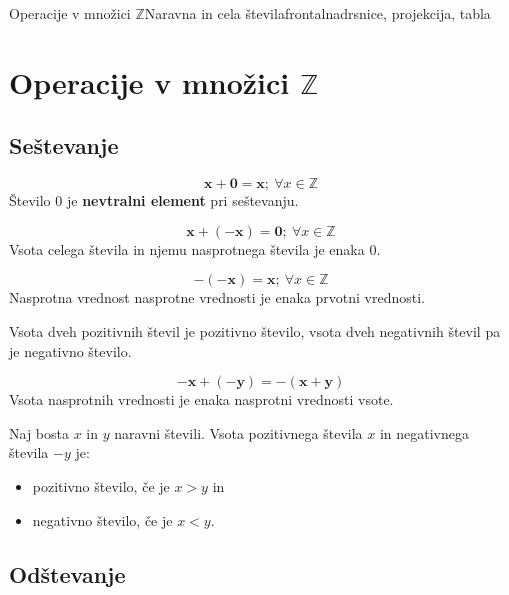 \begin{priprava}{4}{}{Operacije v množici $\mathbb{Z}$}{Naravna in cela števila}{frontalna}{drsnice, projekcija, tabla}


    \section{Operacije v množici $\mathbb{Z}$}

    \subsection{Seštevanje}

     \begin{multicols}{2}
        $$\mathbf{x+0=x}; ~\forall x\in\mathbb{Z}$$
        Število $0$ je \textbf{nevtralni element} pri seštevanju.
     

     
        $$\mathbf{x+(-x)=0}; ~\forall x\in\mathbb{Z} $$
        Vsota celega števila in njemu nasprotnega števila je enaka $0$.
     

     
        $$\mathbf{-(-x)=x}; ~\forall x\in\mathbb{Z}$$
        Nasprotna vrednost nasprotne vrednosti je enaka prvotni vrednosti.
     \newline
 

     
        Vsota dveh pozitivnih števil je pozitivno število, vsota dveh negativnih števil pa je negativno število.
     

     
        $$\mathbf{-x+(-y)=-(x+y)}$$
        Vsota nasprotnih vrednosti je enaka nasprotni vrednosti vsote.
     \newline


        Naj bosta $x$ in $y$ naravni števili. Vsota pozitivnega števila $x$ in negativnega števila $-y$ je:
        \begin{itemize}
            \item pozitivno število, če je $x>y$ in
            \item negativno število, če je $x<y$.
        \end{itemize}
     
    \end{multicols}
 


 
    \subsection{Odštevanje}


\end{priprava}
